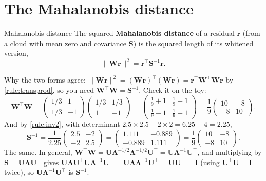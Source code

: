 \documentclass[11pt,a4paper,oneside,openany]{book}
\newcommand{\B}[1]{{\symbf{#1}}}
\newcommand{\B}[1]{{\bm{#1}}}
\newcommand{\T}{^{\top}}
\newcommand{\nrm}[1]{\lVert #1\rVert}
\newcommand{\vr}{\B{r}}
\newcommand{\mS}{\B{S}}
\newcommand{\mW}{\B{W}}
\newcommand{\mU}{\B{U}}
\newcommand{\mI}{\B{I}}
\newcommand{\mLam}{\B{\Lambda}}
\begin{document}
\section{The Mahalanobis distance}

\begin{defn}{Mahalanobis distance}
The squared \textbf{Mahalanobis distance} of a residual $\vr$ (from a cloud with mean zero and covariance $\mS$) is the squared
length of its whitened version,
\[
  \nrm{\mW\vr}^2=\vr\T\mS^{-1}\vr .
\]
\end{defn}

Why the two forms agree: $\nrm{\mW\vr}^2=(\mW\vr)\T(\mW\vr)=\vr\T\mW\T\mW\vr$ by \cref{rule:transprod}, so you need
$\mW\T\mW=\mS^{-1}$. Check it on the toy:
\[
  \mW\T\mW=\begin{pmatrix}1/3&1\\1/3&-1\end{pmatrix}\begin{pmatrix}1/3&1/3\\1&-1\end{pmatrix}
  =\begin{pmatrix}\frac19+1&\frac19-1\\\frac19-1&\frac19+1\end{pmatrix}=\frac19\begin{pmatrix}10&-8\\-8&10\end{pmatrix}.
\]
And by \cref{rule:inv2}, with determinant $2.5\times2.5-2\times2=6.25-4=2.25$,
\[
  \mS^{-1}=\frac1{2.25}\begin{pmatrix}2.5&-2\\-2&2.5\end{pmatrix}=\begin{pmatrix}1.111&-0.889\\-0.889&1.111\end{pmatrix}
  =\frac19\begin{pmatrix}10&-8\\-8&10\end{pmatrix}.
\]
The same. In general, $\mW\T\mW=\mU\mLam^{-1/2}\mLam^{-1/2}\mU\T=\mU\mLam^{-1}\mU\T$, and multiplying by
$\mS=\mU\mLam\mU\T$ gives $\mU\mLam\mU\T\mU\mLam^{-1}\mU\T=\mU\mLam\mLam^{-1}\mU\T=\mU\mU\T=\mI$ (using $\mU\T\mU=\mI$ twice), so
$\mU\mLam^{-1}\mU\T$ is $\mS^{-1}$.
\end{document}
